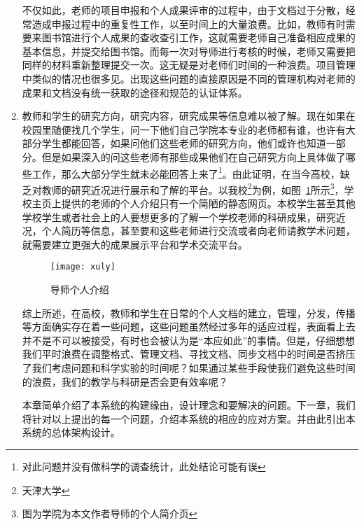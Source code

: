\begin{enumerate}
不仅如此，老师的项目申报和个人成果评审的过程中，由于文档过于分散，经常造成申报过程中的重复性工作，以至时间上的大量浪费。比如，教师有时需要来图书馆进行个人成果的查收查引工作，这就需要老师自己准备相应成果的基本信息，并提交给图书馆。而每一次对导师进行考核的时候，老师又需要把同样的材料重新整理提交一次。这无疑是对老师们时间的一种浪费。项目管理中类似的情况也很多见。出现这些问题的直接原因是不同的管理机构对老师的成果和文档没有统一获取的途径和规范的认证体系。
\item 教师和学生的研究方向，研究内容，研究成果等信息难以被了解。现在如果在校园里随便找几个学生，问一下他们自己学院本专业的老师都有谁，也许有大部分学生都能回答，如果问他们这些老师的研究方向，他们或许也知道一部分。但是如果深入的问这些老师有那些成果他们在自己研究方向上具体做了哪些工作，那么大部分学生就未必能回答上来了\footnote{对此问题并没有做科学的调查统计，此处结论可能有误}。由此证明，在当今高校，缺乏对教师的研究近况进行展示和了解的平台。以我校\footnote{天津大学}为例，如图~\ref{fig:xfig1}所示\footnote{图为学院为本文作者导师的个人简介页}，学校主页上提供的老师的个人介绍只有一个简陋的静态网页。本校学生甚至其他学校学生或者社会上的人要想更多的了解一个学校老师的科研成果，研究近况，个人简历等信息，甚至要和这些老师进行交流或者向老师请教学术问题，就需要建立更强大的成果展示平台和学术交流平台。
\begin{figure}[H] 
  \centering
  \texttt{[image: xuly]}
  \caption{导师个人介绍}
  \label{fig:xfig1}
\end{figure}
综上所述，在高校，教师和学生在日常的个人文档的建立，管理，分发，传播等方面确实存在着一些问题，这些问题虽然经过多年的适应过程，表面看上去并不是不可以被接受，有时也会被认为是“本应如此”的事情。但是，仔细想想我们平时浪费在调整格式、管理文档、寻找文档、同步文档中的时间是否挤压了我们考虑问题和科学实验的时间呢？如果通过某些手段使我们避免这些时间的浪费，我们的教学与科研是否会更有效率呢？

本章简单介绍了本系统的构建缘由，设计理念和要解决的问题。下一章，我们将针对以上提出的每一个问题，介绍本系统的相应的应对方案。并由此引出本系统的总体架构设计。
\end{enumerate}